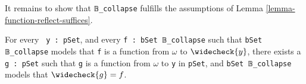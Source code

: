\documentclass[sigplan,10pt,review, autoref,anonymous]{acmart}
\newcommand{\lil}{\lstinline}
\theoremstyle{definition}
\begin{document}
It remains to show that \lil{𝔹_collapse} fulfills the assumptions of Lemma \autoref{lemma-function-reflect-suffices}.

\begin{lemma}\label{lemma-function-reflect}
  For every \lil{ y : pSet}, and every \lil{f : bSet 𝔹_collapse} such that \lil{bSet 𝔹_collapse} models that \lil{f} is a function from \(\omega\) to \(\widecheck{y}\), there exists a \lil{g : pSet} such that \lil{g} is a function from \(\omega\) to \lil{y} in \lil{pSet}, and \lil{bSet 𝔹_collapse} models that \(\widecheck{g} = f\).
\end{lemma}

\end{document}
